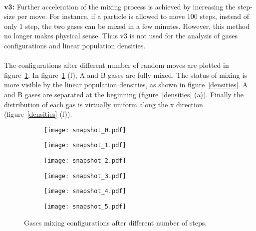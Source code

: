 \documentclass{article}
\begin{document}
\\
\textbf{v3:}  Further acceleration of the mixing process is achieved by increasing the step-size per move. For instance, if a particle is allowed to move 100 steps, instead of only 1 step, the two gases can be mixed in a few minutes. However, this method no longer makes physical sense. Thus v3 is not used for the analysis of gases configurations and linear population densities.\\
\\
The configurations after different number of random moves are plotted in figure~\ref{configurations}. In figure~\ref{configurations} (f), A and B gases are fully mixed. The status of mixing is more visible by the linear population densities, as shown in figure~\ref{densities}. A and B gases are separated at the beginning (figure~\ref{densities} (a)). Finally the distribution of each gas is virtually uniform along the x direction (figure~\ref{densities} (f)).\\

\begin{figure}[h!]
\centering
\begin{subfigure}[b]{0.32\textwidth}
\texttt{[image: snapshot\_0.pdf]}
\end{subfigure}
\begin{subfigure}[b]{0.32\textwidth}
\texttt{[image: snapshot\_1.pdf]}
\end{subfigure}
\begin{subfigure}[b]{0.32\textwidth}
\texttt{[image: snapshot\_2.pdf]}
\end{subfigure}
\begin{subfigure}[b]{0.32\textwidth}
\texttt{[image: snapshot\_3.pdf]}
\end{subfigure}
\begin{subfigure}[b]{0.32\textwidth}
\texttt{[image: snapshot\_4.pdf]}
\end{subfigure}
\begin{subfigure}[b]{0.32\textwidth}
\texttt{[image: snapshot\_5.pdf]}
\end{subfigure}
\caption{Gases mixing configurations after different number of steps.}
\label{configurations}
\end{figure}
\end{document}
